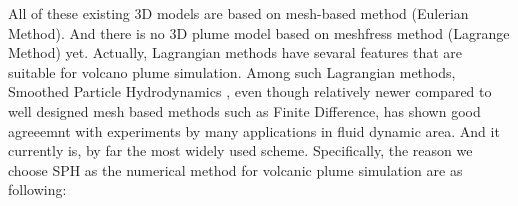 \documentclass[10pt,a4paper]{article}
\begin{document}
All of these existing 3D models are based on mesh-based method (Eulerian Method). And there is no 3D plume model based on meshfress method (Lagrange Method) yet. Actually, Lagrangian methods have sevaral features that are suitable for volcano plume simulation. Among such Lagrangian methods, Smoothed Particle Hydrodynamics \cite{gingold1977smoothed,lucy1977numerical}, even though relatively newer compared to well designed mesh based methods such as Finite Difference, has shown good agreeemnt with experiments by many applications in fluid dynamic area. And it currently is, by far the most widely used scheme. Specifically, the reason we choose SPH as the numerical method for volcanic plume simulation are as following:
\end{document}
